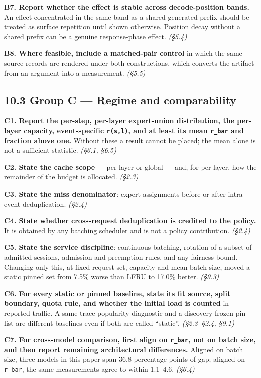 \documentclass[
  10pt,
  letterpaper,
  10pt]{article}
\begin{document}
\textbf{B7. Report whether the effect is stable across decode-position
bands.} An effect concentrated in the same band as a shared generated
prefix should be treated as surface repetition until shown otherwise.
Position decay without a shared prefix can be a genuine response-phase
effect. \emph{(§5.4)}

\textbf{B8. Where feasible, include a matched-pair control} in which the
same source records are rendered under both constructions, which
converts the artifact from an argument into a measurement. \emph{(§5.5)}

\subsection{10.3 Group C --- Regime and
comparability}\label{group-c-regime-and-comparability}

\textbf{C1. Report the per-step, per-layer expert-union distribution,
the per-layer capacity, event-specific \texttt{r(s,l)}, and at least its
mean \texttt{r\_bar} and fraction above one.} Without these a result
cannot be placed; the mean alone is not a sufficient statistic.
\emph{(§6.1, §6.5)}

\textbf{C2. State the cache scope} --- per-layer or global --- and, for
per-layer, how the remainder of the budget is allocated. \emph{(§2.3)}

\textbf{C3. State the miss denominator}: expert assignments before or
after intra-event deduplication. \emph{(§2.4)}

\textbf{C4. State whether cross-request deduplication is credited to the
policy.} It is obtained by any batching scheduler and is not a policy
contribution. \emph{(§2.4)}

\textbf{C5. State the service discipline}: continuous batching, rotation
of a subset of admitted sessions, admission and preemption rules, and
any fairness bound. Changing only this, at fixed request set, capacity
and mean batch size, moved a static pinned set from 7.5\% worse than
LFRU to 17.0\% better. \emph{(§9.3)}

\textbf{C6. For every static or pinned baseline, state its fit source,
split boundary, quota rule, and whether the initial load is counted} in
reported traffic. A same-trace popularity diagnostic and a
discovery-frozen pin list are different baselines even if both are
called ``static''. \emph{(§2.3--§2.4, §9.1)}

\textbf{C7. For cross-model comparison, first align on \texttt{r\_bar},
not on batch size, and then report remaining architectural differences.}
Aligned on batch size, three models in this paper span 36.8 percentage
points of gap; aligned on \texttt{r\_bar}, the same measurements agree
to within 1.1--4.6. \emph{(§6.4)}
\end{document}
